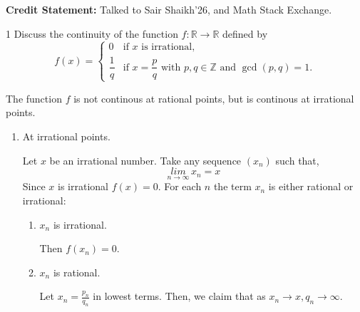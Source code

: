 \documentclass[12pt]{article}
\begin{document}


\bbni
\textbf{Credit Statement:} Talked to Sair Shaikh'26, and Math Stack Exchange.


\begin{problem}{1}
    Discuss the continuity of the function $f : \mathbb{R} \to \mathbb{R}$ defined by
    \[
    f(x) =
    \begin{cases}
    0 & \text{if $x$ is irrational}, \\[6pt]
    \dfrac{1}{q} & \text{if $x = \dfrac{p}{q}$ with $p,q \in \mathbb{Z}$ and $\gcd(p,q)=1$}.
    \end{cases}
    \]
\end{problem}

\begin{solution}
    \bbni

    The function $f$ is not continous at rational points, but is continous at irrational points. 
    \begin{enumerate}
        \item At irrational points. 
        
        Let $x$ be an irrational number. Take any sequence $(x_n)$ such that,        
        \[\underset{n\to \infty}{lim} \, x_n = x\] 
        Since $x$ is irrational $f(x) = 0$. For each $n$ the term $x_n$ is either rational or irrational: 
        \begin{enumerate}
            \item $x_n$ is irrational. 
            
            Then $f(x_n) = 0$.  

            \item $x_n$ is rational. 
            
            Let $x_n = \frac{p_n}{q_n}$ in lowest terms. Then, we claim that as $x_n \to x, q_n \to \infty$. 
        

\end{enumerate}
\end{enumerate}
\end{solution}
\end{document}
